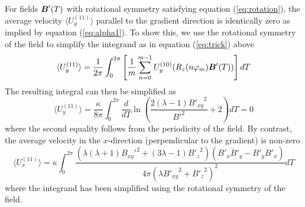 \begin{appendices}
For fields $\boldsymbol{B}'(T)$ with rotational symmetry satisfying equation (\ref{eq:rotation}), the average velocity $\langle U_y^{(11)}\rangle$ parallel to the gradient direction is identically zero as implied by equation (\ref{eq:alpha1}). To show this, we use the rotational symmetry of the field to simplify the integrand as in equation (\ref{eq:trick}) above 
\begin{equation}
    \langle U_y^{(11)}\rangle = \frac{1}{2\pi}\int_0^{2\pi} \left[\frac{1}{m} \sum_{n=0}^{m-1} U_y^{(10)}(R_z(n \varphi_m)\boldsymbol{B}'(T)) \right] dT
\end{equation}
The resulting integral can then be simplified as 
\begin{equation}
    \langle U_y^{(11)}\rangle = \frac{\kappa}{8\pi}\int_0^{2\pi} \frac{d}{d T}  \ln \left(\frac{2 (\lambda -1) {B'_{xy}}^2}{{B'}^2}+2 \right) dT = 0
\end{equation}
where the second equality follows from the periodicity of the field.  By contrast, the average velocity in the $x$-direction (perpendicular to the gradient) is non-zero 
\begin{equation}
    \langle U_x^{(11)}\rangle =\kappa \int_0^{2\pi} \frac{ (  \lambda(\lambda +1) {B_{xy}'}^2 + (3 \lambda -1) {B'_z}^2)(B'_x \dot{B}'_y - B'_y \dot{B}'_x)}{4\pi (\lambda  {B'_{xy}}^2 +{B'_z}^2)^2} dT \label{eq:Ux11}
\end{equation}
where the integrand has been simplified using the rotational symmetry of the field.
\end{appendices}